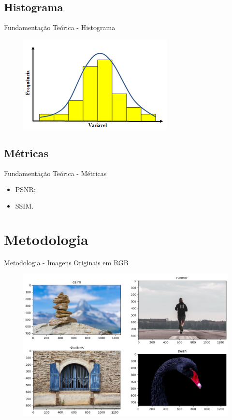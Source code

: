 \documentclass[]{beamer}
\begin{document}
\subsection{Histograma}

\begin{frame}{Fundamentação Teórica - Histograma}
    \begin{figure}
        \includegraphics[scale=0.6]{Imagens/histograma_exemplo.png}
    \end{figure}  
\end{frame}

\subsection{Métricas}

\begin{frame}{Fundamentação Teórica - Métricas}
\begin{itemize}
    \item PSNR;
    \item SSIM.
\end{itemize}
    
\end{frame}

\section{Metodologia}

\begin{frame}{Metodologia - Imagens Originais em RGB}
    \begin{figure}
        \includegraphics[scale=0.4]{Imagens/metodologia-originais-rgb.png}
    \end{figure}  
\end{frame}
\end{document}

